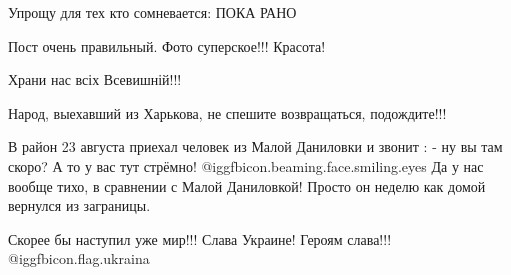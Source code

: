 \begin{itemize}
Упрощу для тех кто сомневается: ПОКА РАНО

Пост очень правильный.
Фото суперское!!! Красота!

Храни нас всіх Всевишній!!!

Народ, выехавший из Харькова, не спешите возвращаться, подождите!!!

В район 23 августа приехал человек из Малой Даниловки и звонит : - ну вы там скоро? А то у вас тут стрёмно!  @igg{fbicon.beaming.face.smiling.eyes} 
Да у нас вообще тихо, в сравнении с Малой Даниловкой! Просто он неделю как домой вернулся из заграницы.

Скорее бы наступил уже мир!!!
Слава Украине! Героям слава!!! @igg{fbicon.flag.ukraina}

\end{itemize} %
